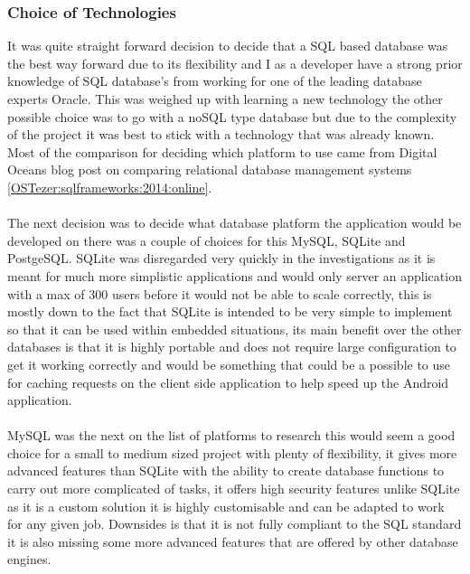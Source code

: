 \subsubsection*{Choice of Technologies}
\label{sec:database_choice_of_tech}
 
It was quite straight forward decision to decide that a SQL based database was the best way forward due to its flexibility and I as a developer have a strong prior knowledge of SQL database's from working for one of the leading database experts Oracle. This was weighed up with learning a new technology the other possible choice was to go with a noSQL type database but due to the complexity of the project it was best to stick with a technology that was already known. Most of the comparison for deciding which platform to use came from Digital Oceans blog post on comparing relational database management systems \ref{OSTezer:sqlframeworks:2014:online}.\\
\\
The next decision was to decide what database platform the application would be developed on there was a couple of choices for this MySQL, SQLite and PostgeSQL. SQLite was disregarded very quickly in the investigations as it is meant for much more simplistic applications and would only server an application with a max of 300 users before it would not be able to scale correctly, this is mostly down to the fact that SQLite is intended to be very simple to implement so that it can be used within embedded situations, its main benefit over the other databases is that it is highly portable and does not require large configuration to get it working correctly and would be something that could be a possible to use for caching requests on the client side application to help speed up the Android application.\\
\\
MySQL was the next on the list of platforms to research this would seem a good choice for a small to medium sized project with plenty of flexibility, it gives more advanced features than SQLite with the ability to create database functions to carry out more complicated of tasks, it offers high security features unlike SQLite as it is a custom solution it is highly customisable and can be adapted to work for any given job. Downsides is that it is not fully compliant to the SQL standard it is also missing some more advanced features that are offered by other database engines.\\
\\
